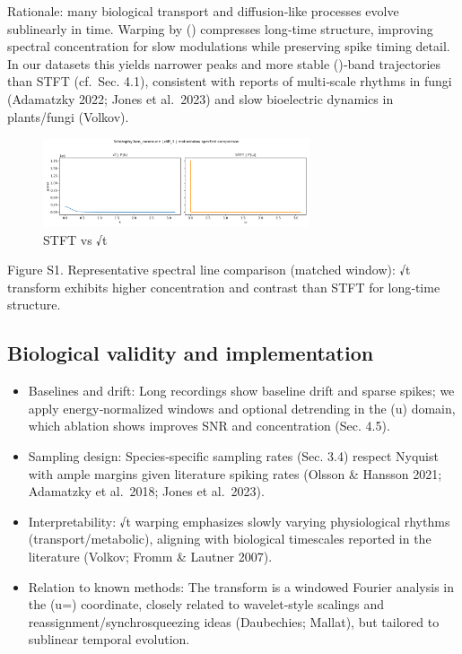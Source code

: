 \documentclass[
  11pt,
]{article}
\providecommand{\tightlist}{%
  \setlength{\itemsep}{0pt}\setlength{\parskip}{0pt}}
\begin{document}
Rationale: many biological transport and diffusion‑like processes evolve
sublinearly in time. Warping by () compresses long‑time
structure, improving spectral concentration for slow modulations while
preserving spike timing detail. In our datasets this yields narrower
peaks and more stable (\tau)‑band trajectories than STFT (cf.~Sec. 4.1),
consistent with reports of multi‑scale rhythms in fungi (Adamatzky 2022;
Jones et al.~2023) and slow bioelectric dynamics in plants/fungi
(Volkov).

\begin{figure}
\centering
\includegraphics[width=0.7\textwidth,height=\textheight]{figs/Schizophyllum_commune_stft_vs_sqrt.png}
\caption{STFT vs √t}
\end{figure}

Figure S1. Representative spectral line comparison (matched window): √t
transform exhibits higher concentration and contrast than STFT for
long‑time structure.

\hypertarget{biological-validity-and-implementation}{%
\subsection{Biological validity and
implementation}\label{biological-validity-and-implementation}}

\begin{itemize}
\tightlist
\item
  Baselines and drift: Long recordings show baseline drift and sparse
  spikes; we apply energy‑normalized windows and optional detrending in
  the (u) domain, which ablation shows improves SNR and concentration
  (Sec. 4.5).
\item
  Sampling design: Species‑specific sampling rates (Sec. 3.4) respect
  Nyquist with ample margins given literature spiking rates (Olsson \&
  Hansson 2021; Adamatzky et al.~2018; Jones et al.~2023).
\item
  Interpretability: √t warping emphasizes slowly varying physiological
  rhythms (transport/metabolic), aligning with biological timescales
  reported in the literature (Volkov; Fromm \& Lautner 2007).
\item
  Relation to known methods: The transform is a windowed Fourier
  analysis in the (u=) coordinate, closely related to
  wavelet‑style scalings and reassignment/synchrosqueezing ideas
  (Daubechies; Mallat), but tailored to sublinear temporal evolution.
\end{itemize}
\end{document}
